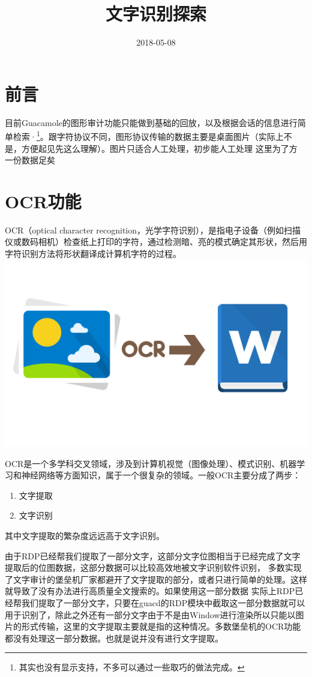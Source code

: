 \documentclass[fontset=windows,11pt]{ctexart}
\date{2018-05-08}
\title{文字识别探索}
\begin{document}
\maketitle
\tableofcontents


\section{前言}
\label{sec-1}
目前Guacamole的图形审计功能只能做到基础的回放，以及根据会话的信息进行简单检索·\footnote{其实也没有显示支持，不多可以通过一些取巧的做法完成。}。跟字符协议不同，图形协议传输的数据主要是桌面图片（实际上不是，方便起见先这么理解）。图片只适合人工处理，初步能人工处理
这里为了方
一份数据足矣
\section{OCR功能}
\label{sec-2}
 OCR（optical character recognition，光学字符识别），是指电子设备（例如扫描仪或数码相机）检查纸上打印的字符，通过检测暗、亮的模式确定其形状，然后用字符识别方法将形状翻译成计算机字符的过程。
\includegraphics[width=.9\linewidth]{./文字识别探索/ocr-to-word.png}

OCR是一个多学科交叉领域，涉及到计算机视觉（图像处理）、模式识别、机器学习和神经网络等方面知识，属于一个很复杂的领域。一般OCR主要分成了两步：
\begin{enumerate}
\item 文字提取
\item 文字识别
\end{enumerate}

其中文字提取的繁杂度远远高于文字识别\footnotemark[1]{}。

由于RDP已经帮我们提取了一部分文字，这部分文字位图相当于已经完成了文字提取后的位图数据，这部分数据可以比较高效地被文字识别软件识别，
多数实现了文字审计的堡垒机厂家都避开了文字提取的部分，或者只进行简单的处理。这样就导致了没有办法进行高质量全文搜索的。如果使用这一部分数据
 实际上RDP已经帮我们提取了一部分文字，只要在guacd的RDP模块中截取这一部分数据就可以用于识别了，除此之外还有一部分文字由于不是由Window进行渲染所以只能以图片的形式传输，这里的文字提取主要就是指的这种情况。多数堡垒机的OCR功能都没有处理这一部分数据。也就是说并没有进行文字提取。
\end{document}

